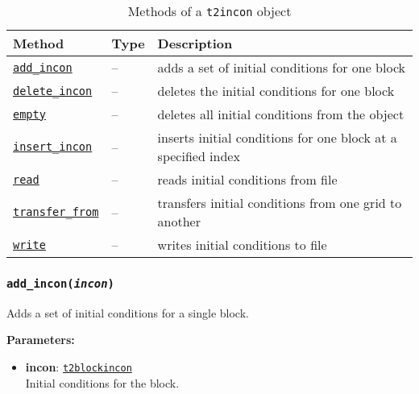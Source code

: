 \begin{table}
  \begin{center}
    \begin{tabular}{|l|l|p{65mm}|}
      \hline
      \textbf{Method} & \textbf{Type} & \textbf{Description}\\
      \hline
      \hyperref[sec:t2incon:add_incon]{\texttt{add\_incon}} & -- & adds a set of initial conditions for one block\\
      \hyperref[sec:t2incon:delete_incon]{\texttt{delete\_incon}} & -- & deletes the initial conditions for one block\\
      \hyperref[sec:t2incon:empty]{\texttt{empty}} & -- & deletes all initial conditions from the object\\
      \hyperref[sec:t2incon:insert_incon]{\texttt{insert\_incon}} & -- & inserts initial conditions for one block at a specified index\\
      \hyperref[sec:t2incon:read]{\texttt{read}} & -- & reads initial conditions from file\\
      \hyperref[sec:t2incon:transfer_from]{\texttt{transfer\_from}} & -- & transfers initial conditions from one grid to another\\
      \hyperref[sec:t2incon:write]{\texttt{write}} & -- & writes initial conditions to file\\
      \hline
    \end{tabular}
    \caption{Methods of a \texttt{t2incon} object}
    \label{tb:t2incon_methods}
  \end{center}
\end{table}

\begin{snugshade}
\subsubsection{\texttt{add\_incon(\emph{incon})}}
\end{snugshade}
\label{sec:t2incon:add_incon}

Adds a set of initial conditions for a single block.

\textbf{Parameters:}
\begin{itemize}
\item \textbf{incon}: \hyperref[t2blockincons]{\texttt{t2blockincon}}\\
  Initial conditions for the block.
\end{itemize}

